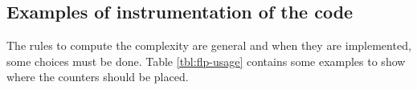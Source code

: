 
\subsection{Examples of instrumentation of the code}
The rules to compute the complexity are general and when they are
implemented, some choices must be done. Table \ref{tbl:flp-usage}
contains some examples to show where the counters should be placed.

